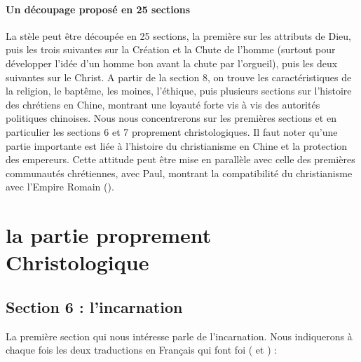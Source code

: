 \paragraph{Un découpage proposé en 25 sections} La stèle peut être découpée en 25 sections, la première sur les attributs de Dieu, puis les trois suivantes sur la Création et la Chute de l'homme (surtout pour développer l'idée d'un homme bon avant la chute par l'orgueil), puis les deux suivantes sur le Christ. A partir de la section 8, on trouve les caractéristiques de la religion, le baptême, les moines, l'éthique, puis plusieurs sections sur l'histoire des chrétiens en Chine, montrant une loyauté forte vis à vis des autorités politiques chinoises. Nous nous concentrerons sur les premières sections et en particulier les sections 6 et 7 proprement christologiques.  Il faut noter qu'une partie importante est liée à l'histoire du christianisme en Chine et la protection des empereurs. Cette attitude peut être mise en parallèle avec celle des premières communautés chrétiennes, avec Paul, montrant la compatibilité du christianisme avec l'Empire Romain (\cite{Baslez:MondeDevnuChretien}). 






\section{la partie proprement Christologique}

\subsection{Section 6 : l'incarnation} 

La première section qui nous intéresse parle de l'incarnation. Nous indiquerons à chaque fois les deux traductions en Français qui font foi (\cite{Havret:stelechretienne} et \cite{Pauthier:linscriptionSinganfou} ) :
 

